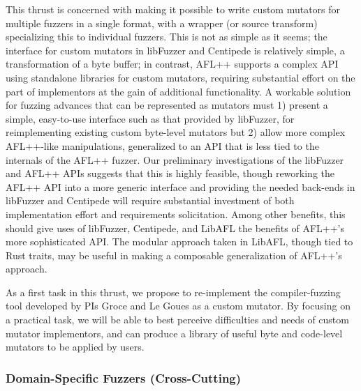 This thrust is concerned with making it possible to write custom mutators for 
multiple fuzzers in a single format, with a wrapper (or source transform) 
specializing this to individual fuzzers.  This is not as simple as it
seems; the interface for custom mutators in libFuzzer and Centipede is
relatively simple, a transformation of a byte buffer; in contrast,
AFL++ supports a complex API using standalone libraries for custom
mutators, requiring substantial effort on the part of implementors at
the gain of additional functionality.  A workable solution for fuzzing
advances that can be represented as mutators must 1) present a simple,
easy-to-use interface such as that provided by libFuzzer, for
reimplementing existing custom byte-level mutators but 2) allow more
complex AFL++-like manipulations, generalized to an API that is less
tied to the internals of the AFL++ fuzzer.  Our preliminary
investigations of the libFuzzer and AFL++ APIs suggests that this is
highly feasible, though reworking the AFL++ API into a more generic
interface and providing the needed back-ends in libFuzzer and
Centipede will require substantial investment of both implementation
effort and requirements solicitation.  Among other benefits, this
should give uses of libFuzzer, Centipede, and LibAFL the benefits of
AFL++'s more sophisticated API. The modular approach taken in LibAFL,
though tied to Rust traits, may be useful in making a
composable generalization of AFL++'s approach.

As a first task in this thrust, we propose to re-implement the compiler-fuzzing 
tool developed by PIs Groce and Le Goues as a custom mutator.  By focusing on a 
practical task, we will be able to best perceive difficulties and needs of 
custom mutator implementors, and can produce a library of useful byte and 
code-level mutators to be applied by users.

\subsubsection{Domain-Specific Fuzzers (Cross-Cutting)}

